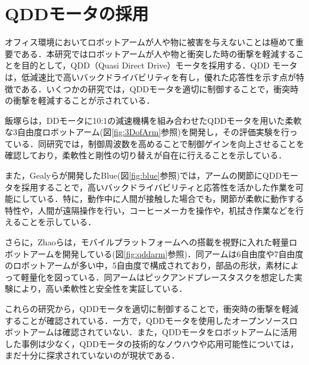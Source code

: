 
\section{QDDモータの採用}
オフィス環境においてロボットアームが人や物に被害を与えないことは極めて重要である．本研究ではロボットアームが人や物と衝突した時の衝撃を軽減することを目的として，QDD（Quasi Direct Drive）モータを採用する．QDD モータは，低減速比で高いバックドライバビリティを有し，優れた応答性を示す点が特徴である．いくつかの研究では，QDDモータを適切に制御することで，衝突時の衝撃を軽減することが示されている．

飯塚ら\cite{飯塚浩太2021}は，DDモータに10:1の減速機構を組み合わせたQDDモータを用いた柔軟な3自由度ロボットアーム(図\ref{fig:3DofArm}参照)を開発し，その評価実験を行っている．同研究では，制御周波数を高めることで制御ゲインを向上させることを確認しており，柔軟性と剛性の切り替えが自在に行えることを示している．

また，Gealyら\cite{gealy2019}が開発したBlue(図\ref{fig:blue}参照)では，アームの関節にQDDモータを採用することで，高いバックドライバビリティと応答性を活かした作業を可能にしている．特に，動作中に人間が接触した場合でも，関節が柔軟に動作する特性や，人間が遠隔操作を行い，コーヒーメーカを操作や，机拭き作業などを行えることを示している\cite{Blue:online}．

さらに，Zhaoら\cite{10106520}は，モバイルプラットフォームへの搭載を視野に入れた軽量ロボットアームを開発している(図\ref{fig:qddarm}参照)．同アームは6自由度や7自由度のロボットアームが多い中，5自由度で構成されており，部品の形状，素材によって軽量化を図っている．同アームはピックアンドプレースタスクを想定した実験により，高い柔軟性と安全性を実証している．

これらの研究から，QDDモータを適切に制御することで，衝突時の衝撃を軽減することが確認されている．一方で，QDDモータを使用したオープンソースロボットアームは確認されていない．また，QDDモータをロボットアームに活用した事例は少なく，QDDモータの技術的なノウハウや応用可能性については，まだ十分に探求されていないのが現状である．

